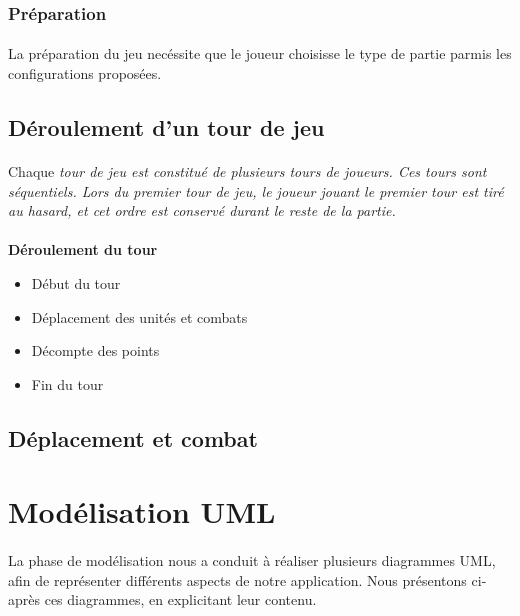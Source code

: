 \documentclass[a4paper]{article}
\begin{document}
\subsubsection{Préparation}
\paragraph{}
La préparation du jeu necéssite que le joueur choisisse le type de partie parmis les configurations proposées.

\subsection{Déroulement d'un tour de jeu}
\paragraph{}
Chaque \em{tour de jeu} est constitué de plusieurs \em{tours de joueurs}. Ces tours sont séquentiels. Lors du premier tour de jeu, le joueur jouant le premier tour est tiré au hasard, et cet ordre est conservé durant le reste de la partie.

\paragraph{}
\textbf{Déroulement du tour}
\begin{itemize}
    \item Début du tour
    \item Déplacement des unités et combats
    \item Décompte des points
    \item Fin du tour
\end{itemize}

\subsection{Déplacement et combat}


\section{Modélisation UML}
\paragraph{}
La phase de modélisation nous a conduit à réaliser plusieurs diagrammes UML, afin de représenter différents aspects de notre application. Nous présentons ci-après ces diagrammes, en explicitant leur contenu.
\end{document}
